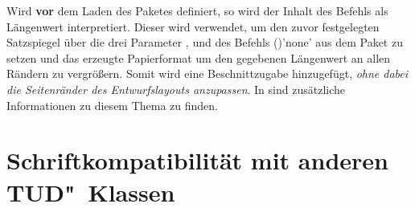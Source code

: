 \begin{DeclareEntity}{}
\begin{Declaration}
Wird  \textbf{vor} dem Laden des Paketes 
definiert, so wird der Inhalt des Befehls als Längenwert interpretiert. Dieser 
wird verwendet, um den zuvor festgelegten Satzspiegel über die drei Parameter
,
 und 
 des
Befehls ()'none' aus dem Paket 
 zu setzen und das erzeugte Papierformat um den gegebenen 
Längenwert an allen Rändern zu vergrößern. Somit wird eine Beschnittzugabe 
hinzugefügt, \emph{ohne dabei die Seitenränder des Entwurfslayouts anzupassen}. 
In  sind zusätzliche Informationen zu diesem Thema zu 
finden.%
\end{Declaration}
%
\end{DeclareEntity}



\section[%
  Das Paket \Package{fix-tudscrfonts} -- Schriftkompatibilität%
]{%
  Schriftkompatibilität mit anderen TUD"~Klassen%
}

